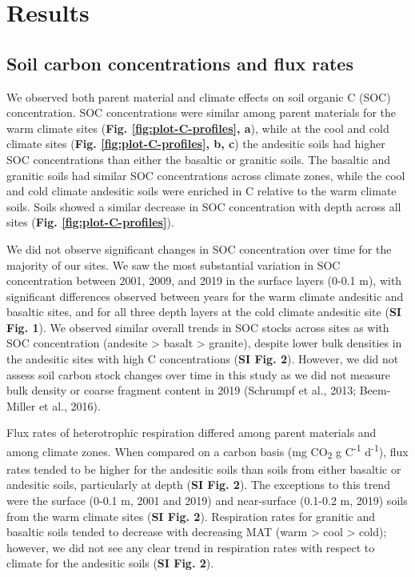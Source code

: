 \documentclass[english,man,floatsintext]{apa6}
\begin{document}
\hypertarget{results}{%
\section{Results}\label{results}}

\hypertarget{soil-carbon-concentrations-and-flux-rates}{%
\subsection{Soil carbon concentrations and flux rates}\label{soil-carbon-concentrations-and-flux-rates}}

We observed both parent material and climate effects on soil organic C (SOC) concentration. SOC concentrations were similar among parent materials for the warm climate sites (\textbf{Fig. \ref{fig:plot-C-profiles}, a}), while at the cool and cold climate sites (\textbf{Fig. \ref{fig:plot-C-profiles}, b, c}) the andesitic soils had higher SOC concentrations than either the basaltic or granitic soils. The basaltic and granitic soils had similar SOC concentrations across climate zones, while the cool and cold climate andesitic soils were enriched in C relative to the warm climate soils. Soils showed a similar decrease in SOC concentration with depth across all sites (\textbf{Fig. \ref{fig:plot-C-profiles}}).

We did not observe significant changes in SOC concentration over time for the majority of our sites. We saw the most substantial variation in SOC concentration between 2001, 2009, and 2019 in the surface layers (0-0.1 m), with significant differences observed between years for the warm climate andesitic and basaltic sites, and for all three depth layers at the cold climate andesitic site (\textbf{SI Fig. 1}). We observed similar overall trends in SOC stocks across sites as with SOC concentration (andesite \textgreater{} basalt \textgreater{} granite), despite lower bulk densities in the andesitic sites with high C concentrations (\textbf{SI Fig. 2}). However, we did not assess soil carbon stock changes over time in this study as we did not measure bulk density or coarse fragment content in 2019 (Schrumpf et al., 2013; Beem-Miller et al., 2016).

Flux rates of heterotrophic respiration differed among parent materials and among climate zones. When compared on a carbon basis (mg CO\textsubscript{2} g C\textsuperscript{-1} d\textsuperscript{-1}), flux rates tended to be higher for the andesitic soils than soils from either basaltic or andesitic soils, particularly at depth (\textbf{SI Fig. 2}). The exceptions to this trend were the surface (0-0.1 m, 2001 and 2019) and near-surface (0.1-0.2 m, 2019) soils from the warm climate sites (\textbf{SI Fig. 2}). Respiration rates for granitic and basaltic soils tended to decrease with decreasing MAT (warm \textgreater{} cool \textgreater{} cold); however, we did not see any clear trend in respiration rates with respect to climate for the andesitic soils (\textbf{SI Fig. 2}).
\end{document}
